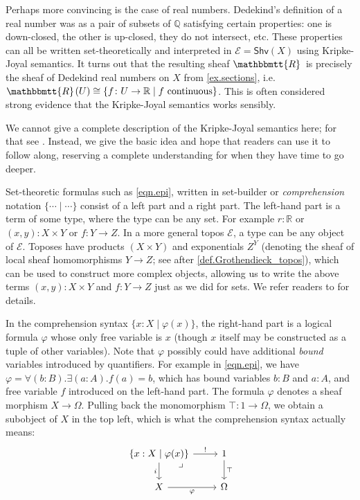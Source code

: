 \documentclass[11pt, oneside, article]{memoir}
\theoremstyle{plain}
\theoremstyle{definition}
\theoremstyle{remark}
\newcommand{\cat}[1]{\mathcal{#1}}
\newcommand{\Fun}[1]{\mathsf{#1}}
\newcommand{\tn}[1]{\textnormal{#1}}
\newcommand{\internal}[1]{\raisebox{-.03ex}{$\mathbbmtt{#1}$}}
\newcommand{\hs}{\hspace{1.1pt}}
\newcommand{\qq}{\mathbb{Q}}
\newcommand{\rr}{\mathbb{R}}
\newcommand{\trr}{\internal{R}\hs}
\newcommand{\shv}{\Fun{Shv}}
\begin{document}
Perhaps more convincing is the case of real numbers. Dedekind's definition of a real number was as a pair of subsets of $\qq$ satisfying certain properties: one is down-closed, the other is up-closed, they do not intersect, etc. These properties can all be written set-theoretically and interpreted in $\cat{E}=\shv(X)$ using Kripke-Joyal semantics. It turns out that the resulting sheaf $\trr$ is precisely the sheaf of Dedekind real numbers on $X$ from \cref{ex.sections}, i.e.\ $\trr(U)\cong\{f\colon U\to\rr\mid f\tn{ continuous}\}$. This is often considered strong evidence that the Kripke-Joyal semantics works sensibly.

We cannot give a complete description of the Kripke-Joyal semantics here; for that see \cite{MacLane.Moerdijk:1992a}. Instead, we give the basic idea and hope that readers can use it to follow along, reserving a complete understanding for when they have time to go deeper.

Set-theoretic formulas such as \eqref{eqn.epi}, written in set-builder or \emph{comprehension} notation $\{\cdots\mid\cdots\}$ consist of a left part and a right part. The left-hand part is a term of some type, where the type can be any set. For example $r:\rr$ or $(x,y): X\times Y$ or $f:Y\to Z$. In a more general topos $\cat{E}$, a type can be any object of $\cat{E}$. Toposes have products $(X\times Y)$ and exponentials $Z^Y$ (denoting the sheaf of local sheaf homomorphisms $Y\to Z$; see after \cref{def.Grothendieck_topos}), which can be used to construct more complex objects, allowing us to write the above terms $(x,y):X\times Y$ and $f:Y\to Z$ just as we did for sets. We refer readers to \cite[Section VI.5]{MacLane.Moerdijk:1992a} for details.

In the comprehension syntax $\{x:X\mid\varphi(x)\}$, the right-hand part is a logical formula $\varphi$ whose only free variable is $x$ (though $x$ itself may be constructed as a tuple of other variables). Note that $\varphi$ possibly could have additional \emph{bound} variables introduced by quantifiers. For example in \eqref{eqn.epi}, we have $\varphi=\forall (b:B).\exists(a:A). f(a)=b$, which has bound variables $b:B$ and $a:A$, and free variable $f$ introduced on the left-hand part. The formula $\varphi$ denotes a sheaf morphism $X\to\Omega$. Pulling back the monomorphism $\top\colon 1\to\Omega$, we obtain a subobject of $X$ in the top left, which is what the comprehension syntax actually means:
\[
\begin{tikzcd}
	\{x:X\mid\varphi(x)\}\ar[r, "!"]\ar[d, "i"']&
	1\ar[d, "\top"]\\
	X\ar[r, "\varphi"']&
	\Omega\ar[ul, phantom, very near end, "\lrcorner"]
\end{tikzcd}
\]
\end{document}
